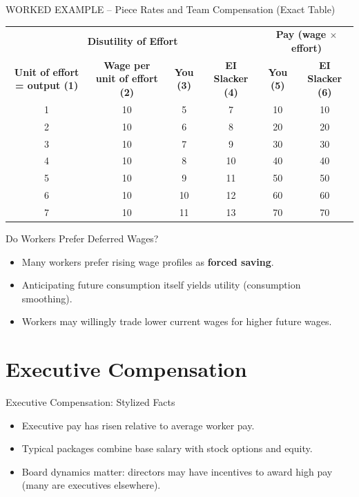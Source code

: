 \documentclass[aspectratio=169]{beamer}
\begin{document}
\begin{frame}{WORKED EXAMPLE -- Piece Rates and Team Compensation (Exact Table)}
\transfade
\scriptsize
\begin{tabular}{cccccc}
\toprule
\multicolumn{4}{c}{\textbf{Disutility of Effort}} & \multicolumn{2}{c}{\textbf{Pay (wage $\times$ effort)}} \\
\textbf{Unit of effort = output (1)} & \textbf{Wage per unit of effort (2)} & \textbf{You (3)} & \textbf{EI Slacker (4)} & \textbf{You (5)} & \textbf{EI Slacker (6)} \\
\midrule
1 & 10 & 5  & 7   & 10 & 10 \\
2 & 10 & 6  & 8   & 20 & 20 \\
3 & 10 & 7  & 9   & 30 & 30 \\
4 & 10 & 8  & 10  & 40 & 40 \\
5 & 10 & 9  & 11  & 50 & 50 \\
6 & 10 & 10 & 12  & 60 & 60 \\
7 & 10 & 11 & 13  & 70 & 70 \\
\bottomrule
\end{tabular}
\end{frame}

\begin{frame}{Do Workers Prefer Deferred Wages?}
\transfade
\begin{itemize}[<+->]
  \item Many workers prefer rising wage profiles as \textbf{forced saving}.
  \item Anticipating future consumption itself yields utility (consumption smoothing).
  \item Workers may willingly trade lower current wages for higher future wages.
\end{itemize}
\end{frame}

\section{Executive Compensation}

\begin{frame}{Executive Compensation: Stylized Facts}
\transfade
\begin{itemize}[<+->]
  \item Executive pay has risen relative to average worker pay.
  \item Typical packages combine base salary with stock options and equity.
  \item Board dynamics matter: directors may have incentives to award high pay (many are executives elsewhere).
\end{itemize}
\end{frame}
\end{document}
